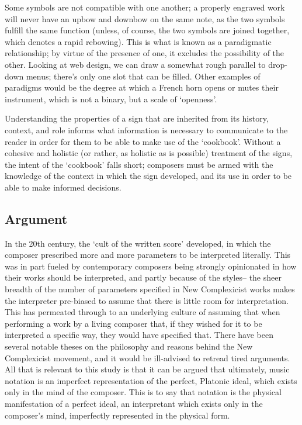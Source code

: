 Some symbols are not compatible with one another; a properly engraved work will never have an upbow and downbow on the same note, as the two symbols fulfill the same function (unless, of course, the two symbols are joined together, which denotes a rapid rebowing).
This is what is known as a paradigmatic relationship; by virtue of the presence of one, it excludes the possibility of the other.
Looking at web design, we can draw a somewhat rough parallel to drop-down menus; there's only one slot that can be filled.
Other examples of paradigms would be the degree at which a French horn opens or mutes their instrument, which is not a binary, but a scale of `openness'.

Understanding the properties of a sign that are inherited from its history, context, and role informs what information is necessary to communicate to the reader in order for them to be able to make use of the `cookbook'.
Without a cohesive and holistic (or rather, as holistic as is possible) treatment of the signs, the intent of the `cookbook' falls short; composers must be armed with the knowledge of the context in which the sign developed, and its use in order to be able to make informed decisions.



\subsection{Argument}
In the 20th century, the `cult of the written score' developed, in which the composer prescribed more and more parameters to be interpreted literally.\autocite[]{citation very much needed}
This was in part fueled by contemporary composers being strongly opinionated in how their works should be interpreted, and partly because of the styles-- the sheer breadth of the number of parameters specified in New Complexicist works makes the interpreter pre-biased to assume that there is little room for interpretation.
This has permeated through to an underlying culture of assuming that when performing a work by a living composer that, if they wished for it to be interpreted a specific way, they would have specified that.\autocite[]{can't really cite this}
There have been several notable theses on the philosophy and reasons behind the New Complexicist movement, and it would be ill-advised to retread tired arguments.
All that is relevant to this study is that it can be argued that ultimately, music notation is an imperfect representation of the perfect, Platonic ideal, which exists only in the mind of the composer. 
This is to say that notation is the physical manifestation of a perfect ideal, an interpretant which exists only in the composer's mind, imperfectly represented in the physical form.


